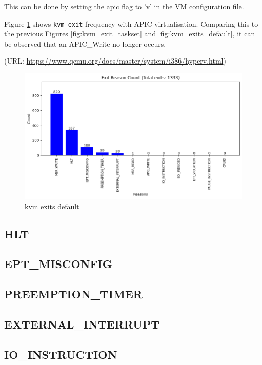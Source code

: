 \documentclass[MMR,Master,english]{twbook}
\begin{document}
This can be done by setting the apic flag to 'v' in the VM configuration file.

Figure \ref{fig:kvm_exit_vapic} shows \texttt{kvm\_exit} frequency with APIC virtualisation. Comparing this to the previous Figures \ref{fig:kvm_exit_taskset} and \ref{fig:kvm_exits_default}, it can be observed that an APIC\_Write no longer occurs.


(URL: \url{https://www.qemu.org/docs/master/system/i386/hyperv.html})


\begin{figure}[H]
	\centering
	\includegraphics[width=1.0\columnwidth]{img/kvm_exit_vapic.png}
	\caption[kvm exits default]{kvm exits default}
	\label{fig:kvm_exit_vapic}
\end{figure}
\clearpage

\clearpage
\subsection{HLT}

\clearpage
\subsection{EPT\_MISCONFIG}

\clearpage
\subsection{PREEMPTION\_TIMER}

\clearpage
\subsection{EXTERNAL\_INTERRUPT}

\clearpage
\subsection{IO\_INSTRUCTION}
\end{document}
